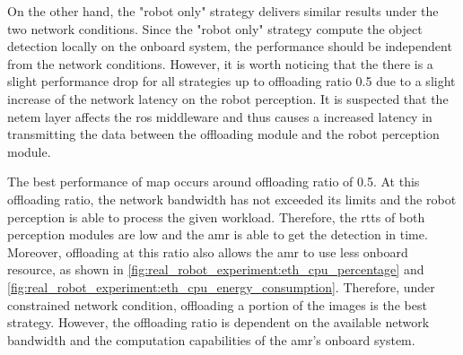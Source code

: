 On the other hand, the "robot only" strategy delivers similar results under the two network conditions. Since the "robot only" strategy compute the object detection locally on the onboard system, the performance should be independent from the network conditions. However, it is worth noticing that the there is a slight performance drop for all strategies up to offloading ratio 0.5 due to a slight increase of the network latency on the robot perception. It is suspected that the \gls{netem} layer affects the \gls{ros} middleware and thus causes a increased latency in transmitting the data between the offloading module and the robot perception module. 

The best performance of \gls{map} occurs around offloading ratio of 0.5. At this offloading ratio, the network bandwidth has not exceeded its limits and the robot perception is able to process the given workload. Therefore, the \glspl{rtt} of both perception modules are low and the \gls{amr} is able to get the detection in time. Moreover, offloading at this ratio also allows the \gls{amr} to use less onboard resource, as shown in \cref{fig:real_robot_experiment:eth_cpu_percentage} and \cref{fig:real_robot_experiment:eth_cpu_energy_consumption}. Therefore, under constrained network condition, offloading a portion of the images is the best strategy. However, the offloading ratio is dependent on the available network bandwidth and the computation capabilities of the \gls{amr}'s onboard system.


